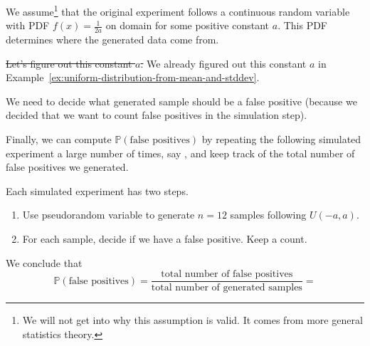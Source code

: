 \documentclass[../main.tex]{subfiles}
\begin{document}
\begin{example}
  We assume\footnote{We will not get into why this assumption is valid. It comes from more general statistics theory.}  that the original experiment follows a continuous random variable with PDF \(f(x) = \frac{1}{2a}\) on domain \underline{\hspace{1in}} for some positive constant \(a\).  This PDF determines where the generated data come from.

  \sout{Let's figure out this constant \(a\).} We already figured out this constant \(a\) in Example~\ref{ex:uniform-distribution-from-mean-and-stddev}.

  We need to decide what generated sample should be a false positive (because we decided that we want to count false positives in the simulation step).

  Finally, we can compute \(\mathbb{P}(\text{false positives})\) by repeating the following simulated experiment a large number of times, say \underline{\hspace{2cm}}, and keep track of the total number of false positives we generated.

  Each simulated experiment has two steps.
  \begin{enumerate}
    \item Use pseudorandom variable to generate \(n = 12\) samples following \(U(-a,a)\).
    \item For each sample, decide if we have a false positive.  Keep a count.
  \end{enumerate}

  We conclude that 
  \[
    \mathbb{P}(\text{false positives}) = \frac{\text{total number of false positives}}{\text{total number of generated samples}} = 
  \]
\end{example}
\end{document}
